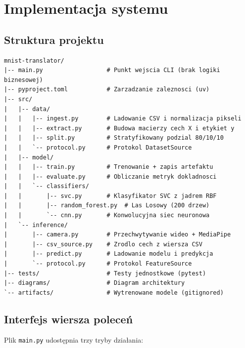 \chapter{Implementacja systemu}
\label{cha:pierwszyDokument}

\section{Struktura projektu}

\begin{lstlisting}[style=styleBash, caption={Struktura katalogów projektu mnist-translator}, label=lst:struktura, numbers=none]
mnist-translator/
|-- main.py                  # Punkt wejscia CLI (brak logiki biznesowej)
|-- pyproject.toml           # Zarzadzanie zaleznosci (uv)
|-- src/
|   |-- data/
|   |   |-- ingest.py        # Ladowanie CSV i normalizacja pikseli
|   |   |-- extract.py       # Budowa macierzy cech X i etykiet y
|   |   |-- split.py         # Stratyfikowany podzial 80/10/10
|   |   `-- protocol.py      # Protokol DatasetSource
|   |-- model/
|   |   |-- train.py         # Trenowanie + zapis artefaktu
|   |   |-- evaluate.py      # Obliczanie metryk dokladnosci
|   |   `-- classifiers/
|   |       |-- svc.py       # Klasyfikator SVC z jadrem RBF
|   |       |-- random_forest.py  # Las Losowy (200 drzew)
|   |       `-- cnn.py       # Konwolucyjna siec neuronowa
|   `-- inference/
|       |-- camera.py        # Przechwytywanie wideo + MediaPipe
|       |-- csv_source.py    # Zrodlo cech z wiersza CSV
|       |-- predict.py       # Ladowanie modelu i predykcja
|       `-- protocol.py      # Protokol FeatureSource
|-- tests/                   # Testy jednostkowe (pytest)
|-- diagrams/                # Diagram architektury
`-- artifacts/               # Wytrenowane modele (gitignored)
\end{lstlisting}

\section{Interfejs wiersza poleceń}

Plik \texttt{main.py} udostępnia trzy tryby działania:

